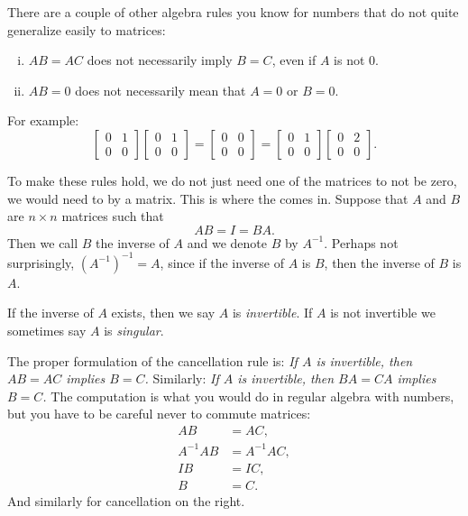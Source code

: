 There are a couple of other algebra rules you know for numbers that do not quite
generalize easily to matrices:
\begin{enumerate}[(i)]
\item $AB = AC$ does not necessarily imply $B=C$, even if $A$ is not 0.
\item $AB = 0$ does not necessarily mean that $A=0$ or $B=0$.
\end{enumerate}
For example:
\begin{equation*}
\begin{bmatrix} 0 & 1 \\ 0 & 0 \end{bmatrix}
\begin{bmatrix} 0 & 1 \\ 0 & 0 \end{bmatrix}
=
\begin{bmatrix} 0 & 0 \\ 0 & 0 \end{bmatrix}
=
\begin{bmatrix} 0 & 1 \\ 0 & 0 \end{bmatrix}
\begin{bmatrix} 0 & 2 \\ 0 & 0 \end{bmatrix} .
\end{equation*}

To make these rules hold, we do not just need one of the matrices to not be zero,
we would need to  by
a matrix.  This is where the \emph{} comes in.
Suppose that $A$ and $B$ are $n \times n$ matrices such that
\begin{equation*}
AB = I = BA .
\end{equation*}
Then we call $B$ the inverse of $A$ and we denote $B$ by $A^{-1}$.
Perhaps not surprisingly, ${(A^{-1})}^{-1} = A$, since if the inverse of $A$ 
is $B$, then the inverse of $B$ is $A$.

If the inverse of $A$ exists, then we say $A$ is
\emph{invertible}.
If $A$ is not invertible we sometimes say $A$ is
\emph{singular}.

The proper formulation of the cancellation rule is:
\emph{If $A$ is invertible,
then
$AB = AC$ implies $B=C$.}
Similarly:
\emph{If $A$ is invertible,
then
$BA = CA$ implies $B=C$.}
The computation is what you would do in regular algebra with numbers,
but you have to
be careful never to commute matrices:
\begin{align*}
AB & = AC , \\
A^{-1}AB & = A^{-1}AC , \\
IB & = IC , \\
B & = C .
\end{align*}
And similarly for cancellation on the right.

